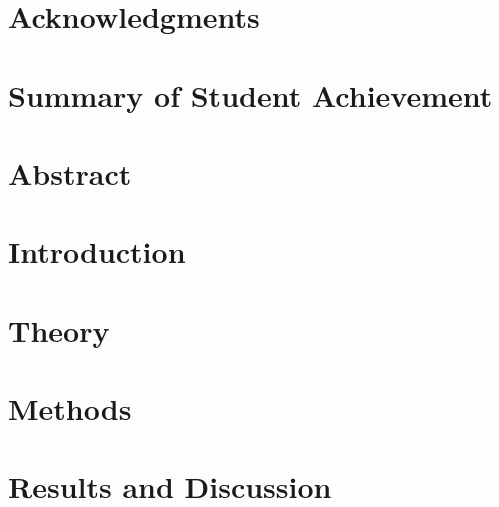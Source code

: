 \documentclass[12pt]{report}
\begin{document}

\restoregeometry

\chapter*{Acknowledgments}

\pagebreak

%



\chapter*{Summary of Student Achievement}

\pagebreak

\listoffigures
\listoftables

\justify

\chapter*{Abstract}

\pagebreak
\printglossaries

\setcounter{tocdepth}{5}
\tableofcontents
\pagebreak

\setcounter{page}{0}
\chapter{Introduction}


\chapter{Theory}


\chapter{Methods}


\chapter{Results and Discussion}\label{chap:results}

\end{document}
